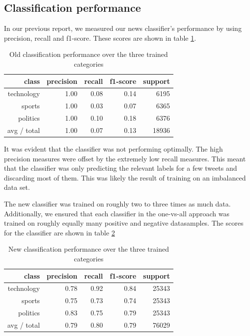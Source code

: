 \documentclass{llncs}
\begin{document}
\subsection{Classification performance}

In our previous report, we measured our news classifier's performance by using precision, recall and f1-score. These scores are shown in table \ref{tbl:oldclassifier}.

\begin{table}
	\begin{center}
		\begin{tabular}{|r|r|r|r|r|} \hline
			class  & precision   & recall & f1-score  & support \\ \hline
			technology    &   1.00 &     0.08  &    0.14   &   6195 \\
			sports   &    1.00   &   0.03   &   0.07   &   6365 \\
			politics   &    1.00  &    0.10   &   0.18   &   6376 \\
			avg / total  &     1.00   &   0.07  &    0.13   &  18936 \\ \hline
		\end{tabular}
	\end{center}
	\caption{Old classification performance over the three trained categories}
	\label{tbl:oldclassifier}
\end{table}

It was evident that the classifier was not performing optimally. The high precision measures were offset by the extremely low recall measures. This meant that the classifier was only predicting the relevant labels for a few tweets and discarding most of them. This was likely the result of training on an imbalanced data set.

The new classifier was trained on roughly two to three times as much data. Additionally, we ensured that each classifier in the one-vs-all approach was trained on roughly equally many positive and negative datasamples. The scores for the classifier are shown in table \ref{tbl:newclassifier}

\begin{table}
	\begin{center}
		\begin{tabular}{|r|r|r|r|r|} \hline
			class  & precision   & recall & f1-score  & support \\ \hline
			technology    &   0.78 &     0.92  &    0.84   &  25343 \\
			sports   &    0.75   &   0.73   &   0.74   &   25343 \\
			politics   &    0.83  &    0.75   &   0.79   &   25343 \\
			avg / total  &     0.79   &   0.80  &    0.79   &  76029 \\ \hline
		\end{tabular}
	\end{center}
	\caption{New classification performance over the three trained categories}
	\label{tbl:newclassifier}
\end{table}
\end{document}
